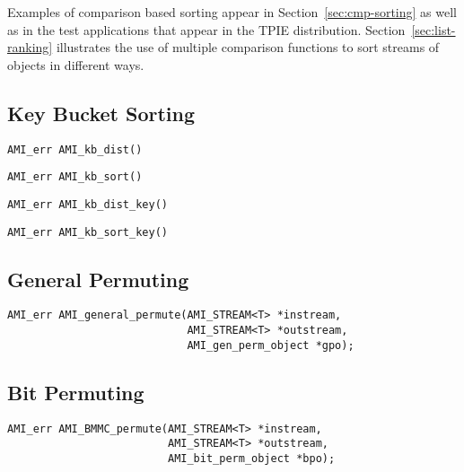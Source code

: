 Examples of comparison based sorting appear in
Section~\ref{sec:cmp-sorting} as well as in the test applications that 
appear in the TPIE distribution.  Section~\ref{sec:list-ranking}
illustrates the use of multiple comparison functions to sort streams
of objects in different ways.

\subsection{Key Bucket Sorting}
\label{sec:ref-ami-kb-sort}


\begin{verbatim}
AMI_err AMI_kb_dist()
\end{verbatim}

\begin{verbatim}
AMI_err AMI_kb_sort()
\end{verbatim}

\begin{verbatim}
AMI_err AMI_kb_dist_key()
\end{verbatim}

\begin{verbatim}
AMI_err AMI_kb_sort_key()
\end{verbatim}

\subsection{General Permuting}
\label{sec:ref-ami-gp}


\begin{verbatim}
AMI_err AMI_general_permute(AMI_STREAM<T> *instream, 
                            AMI_STREAM<T> *outstream, 
                            AMI_gen_perm_object *gpo);
\end{verbatim}

\subsection{Bit Permuting}
\label{sec:ref-ami-bp}

\begin{verbatim}
AMI_err AMI_BMMC_permute(AMI_STREAM<T> *instream, 
                         AMI_STREAM<T> *outstream, 
                         AMI_bit_perm_object *bpo);
\end{verbatim}

